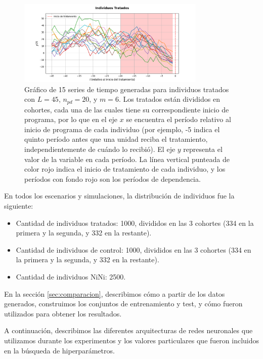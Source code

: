 \documentclass[../../main.tex]{subfiles}
\begin{document}
\begin{figure}[ht]
    \centering
    \includegraphics[width=0.8\textwidth]{figs/series_tratados_exp1.png}
    \caption{Gráfico de 15 series de tiempo generadas para individuos tratados con
    \(L=45\), \(n_{pd}=20\), y \(m=6\). Los tratados están divididos en cohortes, cada una
    de las cuales tiene su correspondiente inicio de programa, por lo que en el eje \(x\)
    se encuentra el período relativo al inicio de programa de cada individuo (por ejemplo,
    -5 indica el quinto período antes que una unidad reciba el tratamiento,
    independientemente de cuándo lo recibió). El eje \(y\) representa el valor de la
    variable en cada período. La línea vertical punteada de color rojo indica el inicio de
    tratamiento de cada individuo, y los períodos con fondo rojo son los períodos de
    dependencia.}
    \label{fig:treated_series_example}
\end{figure}

En todos los escenarios y simulaciones, la distribución de individuos fue la siguiente:
\begin{itemize}[noitemsep]
    \item Cantidad de individuos tratados: 1000, divididos en las 3 cohortes (334 en la
    primera y la segunda, y 332 en la restante).
    \item Cantidad de individuos de control: 1000, divididos en las 3 cohortes (334 en la
    primera y la segunda, y 332 en la restante).
    \item Cantidad de individuos NiNi: 2500.
\end{itemize}

En la sección \ref{sec:comparacion}, describimos cómo a partir de los datos generados,
construimos los conjuntos de entrenamiento y test, y cómo fueron utilizados para obtener
los resultados.

A continuación, describimos las diferentes arquitecturas de redes neuronales que
utilizamos durante los experimentos y los valores particulares que fueron incluidos en la
búsqueda de hiperparámetros.
\end{document}

